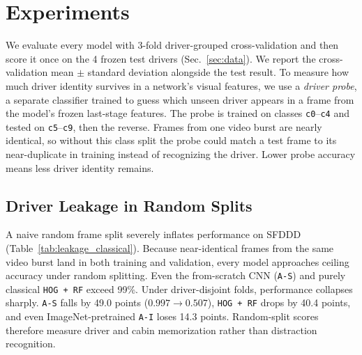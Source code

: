 \section{Experiments}
\label{sec:experiments}


We evaluate every model with 3-fold driver-grouped cross-validation and then score it once on the 4 frozen test drivers (Sec.~\ref{sec:data}). We report the cross-validation mean $\pm$ standard deviation alongside the test result. To measure how much driver identity survives in a network's visual features, we use a \emph{driver probe}, a separate classifier trained to guess which unseen driver appears in a frame from the model's frozen last-stage features. The probe is trained on classes \texttt{c0}--\texttt{c4} and tested on \texttt{c5}--\texttt{c9}, then the reverse. Frames from one video burst are nearly identical, so without this class split the probe could match a test frame to its near-duplicate in training instead of recognizing the driver. Lower probe accuracy means less driver identity remains.

\subsection{Driver Leakage in Random Splits}
\label{sec:leakage}
A naive random frame split severely inflates performance on SFDDD (Table~\ref{tab:leakage_classical}). Because near-identical frames from the same video burst land in both training and validation, every model approaches ceiling accuracy under random splitting. Even the from-scratch CNN (\texttt{A-S}) and purely classical \texttt{HOG + RF} exceed 99\%. Under driver-disjoint folds, performance collapses sharply. \texttt{A-S} falls by 49.0 points ($0.997 \!\to\! 0.507$), \texttt{HOG + RF} drops by 40.4 points, and even ImageNet-pretrained \texttt{A-I} loses 14.3 points. Random-split scores therefore measure driver and cabin memorization rather than distraction recognition.

